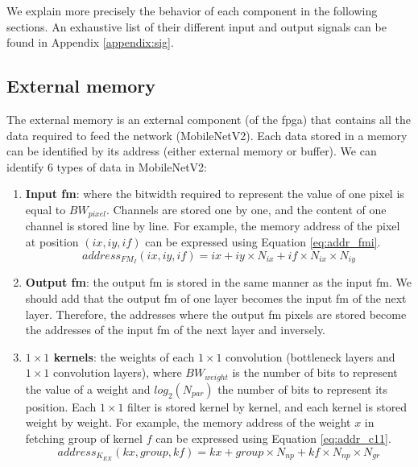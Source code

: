 We explain more precisely the behavior of each component in the following sections. An exhaustive list of their different input and output signals can be found in Appendix \ref{appendix:sig}.
%
\subsection{External memory} \label{subs:extmem}
%
The external memory is an external component (of the \acrshort{fpga}) that contains all the data required to feed the network (MobileNetV2). Each data stored in a memory can be identified by its address (either external memory or buffer). We can identify 6 types of data in MobileNetV2:
%
\begin{enumerate}
    \item \textbf{Input \acrshort{fm}}: where the bitwidth required to represent the value of one pixel is equal to $BW_{pixel}$. Channels are stored one by one, and the content of one channel is stored line by line. For example, the memory address of the pixel at position $\left(ix, iy, if\right)$ can be expressed using Equation \eqref{eq:addr_fmi}.
    \begin{equation}
        address_{FM_{I}}(ix, iy, if) = ix + iy \times N_{ix} + if \times N_{ix} \times N_{iy}
        \label{eq:addr_fmi}
    \end{equation}
    \item \textbf{Output \acrshort{fm}}: the output \acrshort{fm} is stored in the same manner as the input \acrshort{fm}. We should add that the output \acrshort{fm} of one layer becomes the input \acrshort{fm} of the next layer. Therefore, the addresses where the output \acrshort{fm} pixels are stored become the addresses of the input \acrshort{fm} of the next layer and inversely.
    \item \textbf{$1 \times 1$ kernels}: the weights of each $1 \times 1$ convolution (bottleneck layers and $1 \times 1$ convolution layers), where $BW_{weight}$ is the number of bits to represent the value of a weight and $log_2(N_{par})$ the number of bits to represent its position. Each $1 \times 1$ filter is stored kernel by kernel, and each kernel is stored weight by weight. For example, the memory address of the weight $x$ in fetching group  of kernel $f$ can be expressed using Equation \eqref{eq:addr_c11}.
    \begin{equation}
        address_{K_{EX}}(kx, group, kf) = kx + group \times N_{np} + kf \times N_{np} \times N_{gr}
        \label{eq:addr_c11}
    \end{equation}

\end{enumerate}
